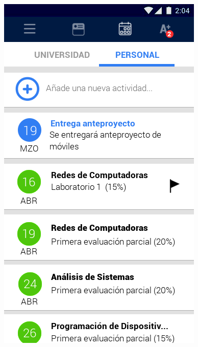 \documentclass[12pt]{article}
\begin{document}
\begin{figure}[!tbp]
\begin{minipage}[b]{0.45\textwidth}
		\includegraphics[width=\textwidth]{img/4.png}
	\end{minipage}
\end{figure}
\end{document}

